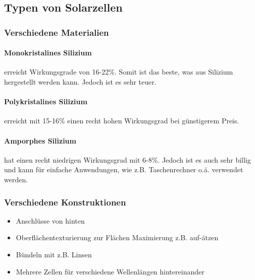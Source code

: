 \subsection{Typen von Solarzellen}

	\subsubsection{Verschiedene Materialien}
		\paragraph{Monokristalines Silizium} erreicht Wirkungsgrade von 16-22\%. Somit ist das beste, was aus Silizium hergestellt werden kann. Jedoch ist es sehr teuer.
		
		\paragraph{Polykristalines Silizium} erreicht mit 15-16\% einen recht hohen Wirkungsgrad bei günstigerem Preis.

		\paragraph{Amporphes Silizium} hat einen recht niedrigen Wirkungsgrad mit 6-8\%. Jedoch ist es auch sehr billig und kann für einfache Anwendungen, wie z.B. Taschenrechner o.ä. verwendet werden.

	\subsubsection{Verschiedene Konstruktionen}
		\begin{itemize}
			\item Anschlüsse von hinten
			\item Oberflächentexturierung zur Flächen Maximierung z.B. auf-ätzen
			\item Bündeln mit z.B. Linsen
			\item Mehrere Zellen für verschiedene Wellenlängen hintereinander
		\end{itemize}
		